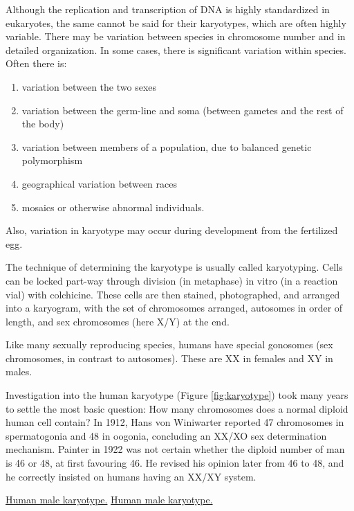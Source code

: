 Although the replication and transcription of DNA is highly standardized in eukaryotes, the same cannot be said for their karyotypes, which are often highly variable. There may be variation between species in chromosome number and in detailed organization. In some cases, there is significant variation within species. Often there is:

\begin{enumerate}
\def\labelenumi{\arabic{enumi}.}
\tightlist
\item
  variation between the two sexes
\item
  variation between the germ-line and soma (between gametes and the rest of the body)
\item
  variation between members of a population, due to balanced genetic polymorphism
\item
  geographical variation between races
\item
  mosaics or otherwise abnormal individuals.
\end{enumerate}

Also, variation in karyotype may occur during development from the fertilized egg.

The technique of determining the karyotype is usually called karyotyping. Cells can be locked part-way through division (in metaphase) in vitro (in a reaction vial) with colchicine. These cells are then stained, photographed, and arranged into a karyogram, with the set of chromosomes arranged, autosomes in order of length, and sex chromosomes (here X/Y) at the end.

Like many sexually reproducing species, humans have special gonosomes (sex chromosomes, in contrast to autosomes). These are XX in females and XY in males.

Investigation into the human karyotype (Figure \ref{fig:karyotype}) took many years to settle the most basic question: How many chromosomes does a normal diploid human cell contain? In 1912, Hans von Winiwarter reported 47 chromosomes in spermatogonia and 48 in oogonia, concluding an XX/XO sex determination mechanism. Painter in 1922 was not certain whether the diploid number of man is 46 or 48, at first favouring 46. He revised his opinion later from 46 to 48, and he correctly insisted on humans having an XX/XY system.

\href{https://commons.wikimedia.org/wiki/File:NHGRI_human_male_karyotype.png}{Human male karyotype.} \href{https://commons.wikimedia.org/wiki/File:NHGRI_human_male_karyotype.png}{Human male karyotype.}

